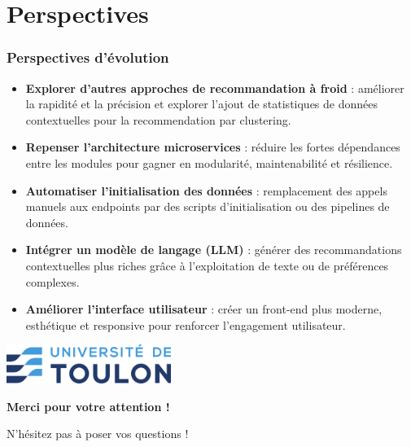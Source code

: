 \documentclass{beamer}
\begin{document}
    \section{Perspectives}
    \begin{frame}
        \frametitle{Perspectives d'évolution}
        \small
        \begin{itemize}
            \item \textbf{Explorer d'autres approches de recommandation à froid} :
            améliorer la rapidité et la précision et explorer l'ajout de statistiques de données contextuelles pour la recommendation par clustering.

            \item \textbf{Repenser l'architecture microservices} :
            réduire les fortes dépendances entre les modules pour gagner en modularité, maintenabilité et résilience.

            \item \textbf{Automatiser l’initialisation des données} :
            remplacement des appels manuels aux endpoints par des scripts d’initialisation ou des pipelines de données.

            \item \textbf{Intégrer un modèle de langage (LLM)} :
            générer des recommandations contextuelles plus riches grâce à l’exploitation de texte ou de préférences complexes.

            \item \textbf{Améliorer l’interface utilisateur} :
            créer un front-end plus moderne, esthétique et responsive pour renforcer l’engagement utilisateur.
        \end{itemize}
    \end{frame}



    \begin{frame}[c]
        \centering
        \includegraphics[width=0.4\textwidth]{logo.png}

        \vspace{1cm}
        {\Huge \textbf{Merci pour votre attention !}}

        \vspace{1.5cm}
        {\Large N'hésitez pas à poser vos questions !}
    \end{frame}
\end{document}
